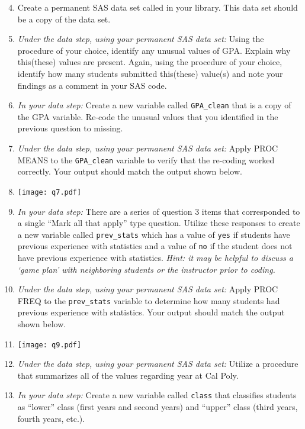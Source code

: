 \begin{enumerate}
\setcounter{enumi}{3}
\item Create a permanent SAS data set called  in your  library.  This data set should be a copy of the  data set.
\item \emph{Under the data step, using your permanent SAS data set:} Using the procedure of your choice, identify any unusual values of GPA.  Explain why this(these) values are present.  Again, using the procedure of your choice, identify how many students submitted this(these) value(s) and note your findings as a comment in your SAS code.
\item \emph{In your data step:} Create a new variable called \texttt{GPA\_clean} that is a copy of the GPA variable.  Re-code the unusual values that you identified in the previous question to missing.
\item \emph{Under the data step, using your permanent SAS data set:} Apply PROC MEANS to the \texttt{GPA\_clean} variable to verify that the re-coding worked correctly.  Your output should match the output shown below.
\item[]\texttt{[image: q7.pdf]}
\item \emph{In your data step:} There are a series of question 3 items that corresponded to a single ``Mark all that apply'' type question.  Utilize these responses to create a new variable called \texttt{prev\_stats} which has a value of \texttt{yes} if students have previous experience with statistics and a value of \texttt{no} if the student does not have previous experience with statistics.  \emph{Hint: it may be helpful to discuss a `game plan' with neighboring students or the instructor prior to coding.}
\item \emph{Under the data step, using your permanent SAS data set:} Apply PROC FREQ to the \texttt{prev\_stats} variable to determine how many students had previous experience with statistics.  Your output should match the output shown below.
\item[]\texttt{[image: q9.pdf]}
\item  \emph{Under the data step, using your permanent SAS data set:}  Utilize a procedure that summarizes all of the values regarding year at Cal Poly.
\item \emph{In your data step:}  Create a new variable called \texttt{class} that classifies students as ``lower'' class (first years and second years) and ``upper'' class (third years, fourth years, etc.).

\end{enumerate}

